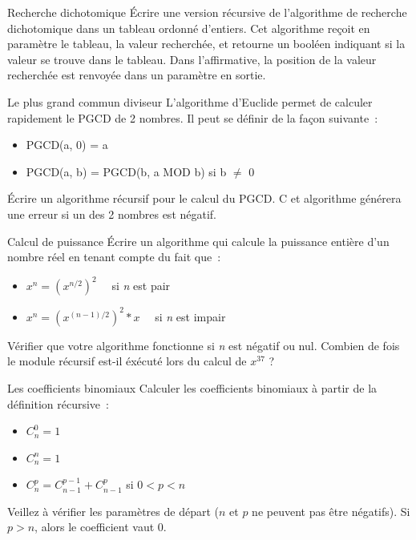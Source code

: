 	\begin{Exercice}{Recherche dichotomique}
		Écrire une version récursive de l'algorithme de recherche 
		dichotomique dans un tableau ordonné d'entiers. Cet algorithme
		reçoit en paramètre le tableau, la valeur recherchée, et 
		retourne un booléen indiquant si la valeur se trouve dans le
		tableau. Dans l'affirmative, la position de la valeur recherchée 
		est renvoyée dans un paramètre en sortie.
	\end{Exercice}
	
	\begin{Exercice}{Le plus grand commun diviseur}
		L'algorithme d'Euclide permet de calculer rapidement le 
		PGCD de 2 nombres. Il peut se définir de la façon suivante~:

		\begin{itemize}
			\item {
				PGCD(a, 0) = a}
			\item {
				PGCD(a, b) = PGCD(b, a MOD b) si b ${\neq}$ 0}
		\end{itemize}
	
		Écrire un algorithme récursif pour le calcul du PGCD. C
		et algorithme générera une erreur si un des 2 nombres est
		négatif.
	\end{Exercice}
	
	\begin{Exercice}{Calcul de puissance}
		Écrire un algorithme qui calcule la puissance entière 
		d'un nombre réel en tenant compte du fait que~:

		\begin{itemize}
			\item {
				$x^n = (x^{n/2})^2$	\ \ si \textit{n} est pair}
			\item {
				$x^n = {(x^{(n-1)/2})^2}*x$ \ \ si \textit{n} est impair}
		\end{itemize}

		Vérifier que votre algorithme fonctionne si \textit{n} 
		est négatif ou nul. Combien de fois le module récursif est-il
		éxécuté lors du calcul de $x^{37}$ ?
	\end{Exercice}
	
	\begin{Exercice}{Les coefficients binomiaux}
		Calculer les coefficients binomiaux à partir de la définition récursive~:

		\begin{itemize}
			\item 
				$C_n^0=1$
			\item 
				$C_n^n=1$
			\item 
			 $C_n^p=C_{n-1}^{p-1}+C_{n-1}^p$ si $0<p<n$
		\end{itemize}

		Veillez à vérifier les paramètres de départ ($n$ et $p$ 
		ne peuvent pas être négatifs). Si $p>n$, alors le coefficient vaut $0$.
	\end{Exercice}
	
